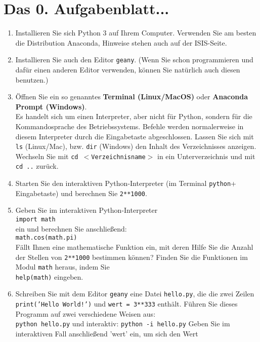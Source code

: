 

\section*{Das 0. Aufgabenblatt...}

\begin{enumerate}[1.]
\item Installieren Sie sich Python 3 auf Ihrem Computer. Verwenden Sie am
besten die Distribution Anaconda, Hinweise stehen auch auf der ISIS-Seite.
\item Installieren Sie auch den Editor \texttt{geany}. (Wenn Sie schon programmieren und dafür einen anderen Editor verwenden, können Sie natürlich auch diesen benutzen.)
\item Öffnen Sie ein so genanntes \textbf{Terminal (Linux/MacOS)} oder 
\textbf{Anaconda Prompt (Windows)}. \\
Es handelt sich um einen Interpreter, aber nicht für Python, sondern für
die Kommandosprache des Betriebssystems. Befehle werden normalerweise in diesem 
Interpreter durch die Eingabetaste abgeschlossen. Lassen Sie
sich mit \texttt{ls} (Linux/Mac), bzw. \texttt{dir} (Windows) den
Inhalt des Verzeichnisses anzeigen. Wechseln Sie mit \texttt{cd $<$Verzeichnisname$>$} in ein Unterverzeichnis und mit \texttt{cd ..} zurück.
\item Starten Sie den interaktiven Python-Interpreter (im Terminal \texttt{python}+ Eingabetaste) und berechnen Sie \texttt{2**1000}.
\item Geben Sie im interaktiven Python-Interpreter\\
\texttt{import math}\\
ein und berechnen Sie anschließend:\\
\texttt{math.cos(math.pi)}\\
Fällt Ihnen eine mathematische Funktion ein, mit deren Hilfe Sie 
die Anzahl der Stellen von \texttt{2**1000} bestimmen können? Finden
Sie die Funktionen im Modul \texttt{math} heraus, indem Sie\\
\texttt{help(math)}
eingeben.
\item Schreiben Sie mit dem Editor \texttt{geany} eine Datei \texttt{hello.py},
die die zwei Zeilen \texttt{print('Hello World!')} und \texttt{wert = 3**333}
enthält.  Führen Sie dieses Programm auf zwei verschiedene Weisen aus:\\
\texttt{python hello.py}
und interaktiv:
\texttt{python -i hello.py}
Geben Sie im interaktiven Fall anschließend 'wert' ein, um sich den Wert

\end{enumerate}
